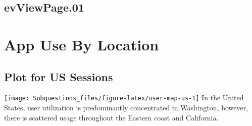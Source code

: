 \documentclass[
]{article}
\begin{document}
\hypertarget{evviewpage.01}{%
\subsection{evViewPage.01}\label{evviewpage.01}}

\hypertarget{app-use-by-location}{%
\section{App Use By Location}\label{app-use-by-location}}

\hypertarget{plot-for-us-sessions}{%
\subsection{Plot for US Sessions}\label{plot-for-us-sessions}}

\texttt{[image: Subquestions\_files/figure-latex/user-map-us-1]}
In the United States, user utilization is predominantly concentrated in
Washington, however, there is scattered usage throughout the Eastern
coast and California.
\end{document}
